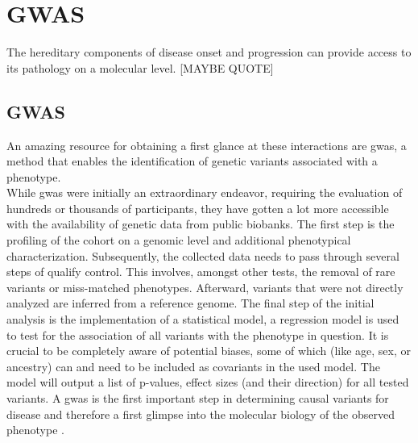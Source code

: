     \section{GWAS}
    \label{sec:gwas}
    The hereditary components of disease onset and progression can provide access to its pathology on a molecular level. [MAYBE QUOTE]

    \subsection{GWAS}
    \label{subsec:gwas_general}
    An amazing resource for obtaining a first glance at these interactions are \ac{gwas}, a method that enables the identification of genetic variants associated with a phenotype.\\
    While \ac{gwas} were initially an extraordinary endeavor, requiring the evaluation of hundreds or thousands of participants, they have gotten a lot more accessible with the availability of genetic data from public biobanks. The first step is the profiling of the cohort on a genomic level and additional phenotypical characterization. Subsequently, the collected data needs to pass through several steps of qualify control. This involves, amongst other tests, the removal of rare variants or miss-matched phenotypes. Afterward, variants that were not directly analyzed are inferred from a reference genome. The final step of the initial analysis is the implementation of a statistical model, a regression model is used to test for the association of all variants with the phenotype in question. It is crucial to be completely aware of potential biases, some of which (like age, sex, or ancestry) can and need to be included as covariants in the used model. \cite{uffelmannGenomewideAssociationStudies2021, flintGWAS2013} The model will output a list of p-values, effect sizes (and their direction) for all tested variants. A \ac{gwas} is the first important step in determining causal variants for disease and therefore a first glimpse into the molecular biology of the observed phenotype \cite{uffelmannGenomewideAssociationStudies2021}.

